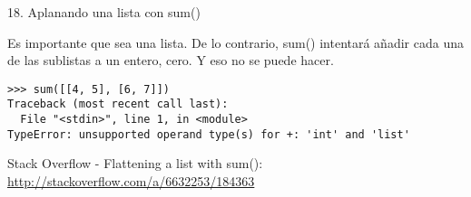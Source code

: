\begin{frame}[fragile]{18. Aplanando una lista con sum()}
  \begin{alertblock}{}
    \centering
    Es importante que  sea una lista. De lo contrario,
    sum() intentará añadir cada una de las sublistas a un entero, cero.
    Y eso no se puede hacer.
  \end{alertblock}

  \scriptsize
  \begin{exampleblock}{}
    \begin{lstlisting}
>>> sum([[4, 5], [6, 7]])
Traceback (most recent call last):
  File "<stdin>", line 1, in <module>
TypeError: unsupported operand type(s) for +: 'int' and 'list'
    \end{lstlisting}
  \end{exampleblock}

  \small
  \begin{block}
    {\centering Stack Overflow - Flattening a list with sum():}
    \centering \url{http://stackoverflow.com/a/6632253/184363 }
  \end{block}
\end{frame}
